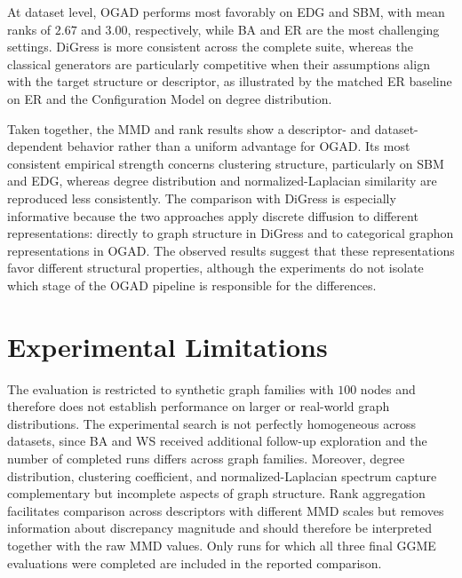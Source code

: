 At dataset level, OGAD performs most favorably on EDG and SBM, with mean ranks of \(2.67\) and \(3.00\), respectively, while BA and ER are the most challenging settings.
DiGress is more consistent across the complete suite, whereas the classical generators are particularly competitive when their assumptions align with the target structure or descriptor, as illustrated by the matched ER baseline on ER and the Configuration Model on degree distribution.

Taken together, the MMD and rank results show a descriptor- and dataset-dependent behavior rather than a uniform advantage for OGAD.
Its most consistent empirical strength concerns clustering structure, particularly on SBM and EDG, whereas degree distribution and normalized-Laplacian similarity are reproduced less consistently.
The comparison with DiGress is especially informative because the two approaches apply discrete diffusion to different representations: directly to graph structure in DiGress and to categorical graphon representations in OGAD.
The observed results suggest that these representations favor different structural properties, although the experiments do not isolate which stage of the OGAD pipeline is responsible for the differences.


\section{Experimental Limitations}
\label{sec:exp_limitations}

The evaluation is restricted to synthetic graph families with \(100\) nodes and therefore does not establish performance on larger or real-world graph distributions.
The experimental search is not perfectly homogeneous across datasets, since BA and WS received additional follow-up exploration and the number of completed runs differs across graph families.
Moreover, degree distribution, clustering coefficient, and normalized-Laplacian spectrum capture complementary but incomplete aspects of graph structure.
Rank aggregation facilitates comparison across descriptors with different MMD scales but removes information about discrepancy magnitude and should therefore be interpreted together with the raw MMD values.
Only runs for which all three final GGME evaluations were completed are included in the reported comparison.